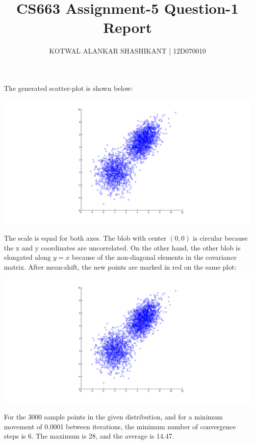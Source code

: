 \documentclass[11pt]{report}
\begin{document}
\title{CS663 Assignment-5 Question-1 Report}
\author{KOTWAL ALANKAR SHASHIKANT | 12D070010}
\maketitle

The generated scatter-plot is shown below:\newline \newline
\centerline{\includegraphics[scale=0.5]{scatter.png}}
\newline
\newline
The scale is equal for both axes. The blob with center $(0, 0)$ is circular because the x and y coordinates are uncorrelated. On the other hand, the other blob is elongated along $y=x$ because of the non-diagonal elements in the covariance matrix.
\newpage
After mean-shift, the new points are marked in red on the same plot:
\centerline{\includegraphics[scale=0.5]{cluster.png}}
\newline
\newline
For the 3000 sample points in the given distribution, and for a minimum movement of 0.0001 between iterations, the minimum number of convergence steps is 6. The maximum is 28, and the average is 14.47.
\end{document}
